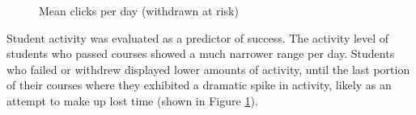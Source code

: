 \documentclass{article}
\begin{document}
\begin{figure}[ht!]
	\centering
	\caption{Mean clicks per day (withdrawn at risk)}
	\label{fig:clicks_per_day_all}
\end{figure}
Student activity was evaluated as a predictor of success. The activity level of students who passed courses showed a much narrower range per day. Students who failed or withdrew displayed lower amounts of activity, until the last portion of their courses where they exhibited a dramatic spike in activity, likely as an attempt to make up lost time (shown in Figure \ref{fig:clicks_per_day_all}).

\clearpage
\end{document}
